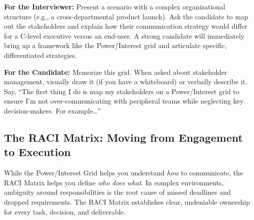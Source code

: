 \documentclass[
  11pt,
  openany,
  oneside]{book}
\renewenvironment{quote}{\begin{customquote}}{\end{customquote}}
\begin{document}
\begin{quote}
\textbf{For the Interviewer:} Present a scenario with a complex
organizational structure (e.g., a cross-departmental product launch).
Ask the candidate to map out the stakeholders and explain how their
communication strategy would differ for a C-level executive versus an
end-user. A strong candidate will immediately bring up a framework like
the Power/Interest grid and articulate specific, differentiated
strategies.
\end{quote}

\begin{quote}
\textbf{For the Candidate:} Memorize this grid. When asked about
stakeholder management, visually draw it (if you have a whiteboard) or
verbally describe it. Say, ``The first thing I do is map my stakeholders
on a Power/Interest grid to ensure I'm not over-communicating with
peripheral teams while neglecting key decision-makers. For
example\ldots{}''
\end{quote}

\subsection{The RACI Matrix: Moving from Engagement to
Execution}\label{the-raci-matrix-moving-from-engagement-to-execution}

While the Power/Interest Grid helps you understand \emph{how} to
communicate, the RACI Matrix helps you define \emph{who does what}. In
complex environments, ambiguity around responsibilities is the root
cause of missed deadlines and dropped requirements. The RACI Matrix
establishes clear, undeniable ownership for every task, decision, and
deliverable.
\end{document}
